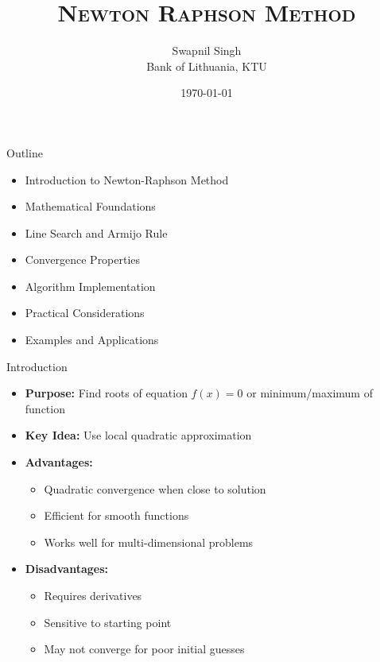 \documentclass[10pt]{beamer}
\title{\textsc{Newton Raphson Method}}
\date{\today}
\author{Swapnil Singh \\ Bank of Lithuania, KTU}
\begin{document}
\begin{frame}
    \titlepage
\end{frame}

\begin{frame}[fragile]{Outline}
    \begin{itemize}
        \item Introduction to Newton-Raphson Method
        \item Mathematical Foundations
        \item Line Search and Armijo Rule
        \item Convergence Properties
        \item Algorithm Implementation
        \item Practical Considerations
        \item Examples and Applications
    \end{itemize}
\end{frame}

\begin{frame}[fragile]{Introduction}
    \begin{itemize}
        \item \textbf{Purpose:} Find roots of equation $f(x) = 0$ or minimum/maximum of function
        \item \textbf{Key Idea:} Use local quadratic approximation
        \item \textbf{Advantages:}
        \begin{itemize}
            \item Quadratic convergence when close to solution
            \item Efficient for smooth functions
            \item Works well for multi-dimensional problems
        \end{itemize}
        \item \textbf{Disadvantages:}
        \begin{itemize}
            \item Requires derivatives
            \item Sensitive to starting point
            \item May not converge for poor initial guesses
        \end{itemize}
    \end{itemize}
\end{frame}
\end{document}
